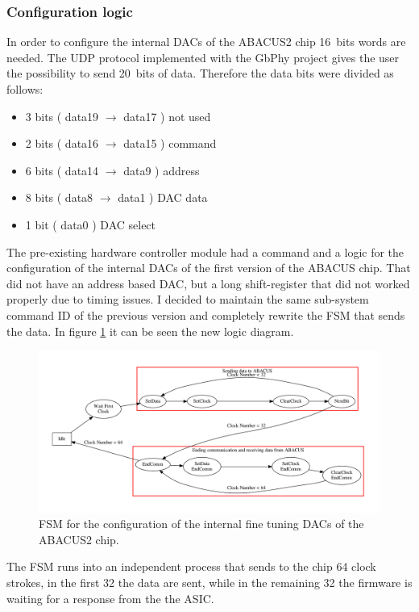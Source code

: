 \subsubsection{Configuration logic}\label{confing}
In order to configure the internal DACs of the ABACUS2 chip 16~bits words are needed. The UDP protocol implemented with the GbPhy project gives the user the possibility to send 20~bits of data.
Therefore the data bits were divided as follows:
\begin{itemize}
	\item 3 bits ( data19 $\rightarrow$ data17 ) not used
	\item 2 bits ( data16 $\rightarrow$ data15 ) command
	\item 6 bits ( data14 $\rightarrow$ data9 ) address
	\item 8 bits ( data8 $\rightarrow$ data1 ) DAC data
	\item 1 bit ( data0 ) DAC select
\end{itemize}
\noindent The pre-existing hardware controller module had a command and a logic for the configuration of the internal DACs of the first version of the ABACUS chip.
That did not have an address based DAC, but a long shift-register that did not worked properly due to timing issues.
I decided to maintain the same sub-system command ID of the previous version and completely rewrite the FSM that sends the data. 
In figure \ref{fig:fsmDACs} it can be seen the new logic diagram.
\begin{figure}[H]
	\centering
	\includegraphics[width=1.0\linewidth]{FSMdiagrams/InternalDACsFSM.pdf}
	\caption{FSM for the configuration of the internal fine tuning DACs of the ABACUS2 chip.}
	\label{fig:fsmDACs}
\end{figure}
\noindent The FSM runs into an independent process that sends to the chip 64 clock strokes, in the first 32 the data are sent, while in the remaining 32 the firmware is waiting for a response from the the ASIC.
